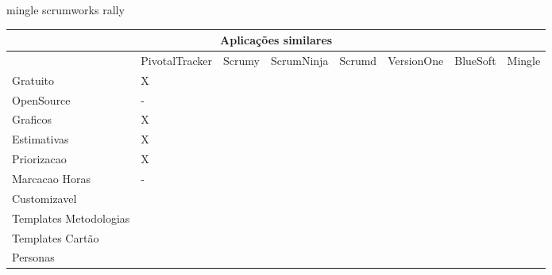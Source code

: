 mingle
scrumworks
rally

\begin{sidewaystable}
	\begin{tabular}{|l|l|l|l|l|l|l|l}
		\hline
		\multicolumn{8}{|c|}{Aplicações similares} \\
		\hline
		 & PivotalTracker & Scrumy & ScrumNinja & Scrumd & VersionOne & BlueSoft & Mingle \\
		Gratuito & X & & & & & & \\
		OpenSource & - & & & & & & \\
		Graficos & X & & & & & & \\
		Estimativas & X & & & & & & \\
		Priorizacao & X & & & & & & \\
		Marcacao Horas & - & & & & & & \\
		Customizavel & & & & & & & \\
		Templates Metodologias & & & & & & & \\
		Templates Cartão & & & & & & & \\
		Personas & & & & & & & \\
		\hline
	\end{tabular}
\end{sidewaystable}


